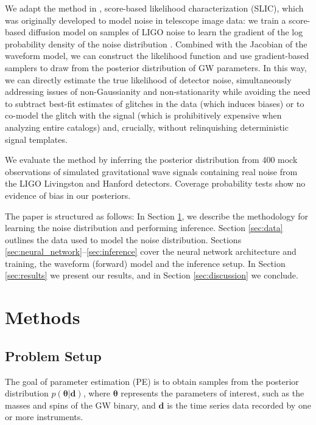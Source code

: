 \documentclass[twocolumn]{aastex631}
\begin{document}
We adapt the method in \citet{legin}, score-based likelihood characterization (SLIC), which  was originally developed to model noise in telescope image data:
 we train a score-based diffusion model on samples of LIGO noise to learn the gradient of the log probability density of the noise distribution \citep{Legin2023icml}. Combined with the Jacobian of the waveform model, we can construct the likelihood function and use gradient-based samplers to draw from the posterior distribution of GW parameters. In this way, we can directly estimate the true likelihood of detector noise, simultaneously addressing issues of non-Gaussianity and non-stationarity while avoiding the need to subtract best-fit estimates of glitches in the data (which induces biases) or to co-model the glitch with the signal (which is prohibitively expensive when analyzing entire catalogs) and, crucially, without relinquishing deterministic signal templates.

We evaluate the method by inferring the posterior distribution from 400 mock observations of simulated gravitational wave signals containing real noise from the LIGO Livingston and Hanford detectors. Coverage probability tests show no evidence of bias in our posteriors.

The paper is structured as follows: In Section \ref{sec:methods}, we describe the methodology for learning the noise distribution and performing inference. Section \ref{sec:data} outlines the data used to model the noise distribution. Sections \ref{sec:neural_network}--\ref{sec:inference} cover the neural network architecture and training, the waveform (forward) model and the inference setup. In Section \ref{sec:results} we present our results, and in Section \ref{sec:discussion} we conclude.



\section{Methods}
\label{sec:methods}

\subsection{Problem Setup}
\label{sec:setup}

The goal of parameter estimation (PE) is to obtain samples from the posterior distribution $p(\boldsymbol{\theta}|\boldsymbol{d})$, where $\boldsymbol{\theta}$ represents the parameters of interest, such as the masses and spins of the GW binary, and $\boldsymbol{d}$ is the time series data recorded by one or more instruments.
\end{document}
